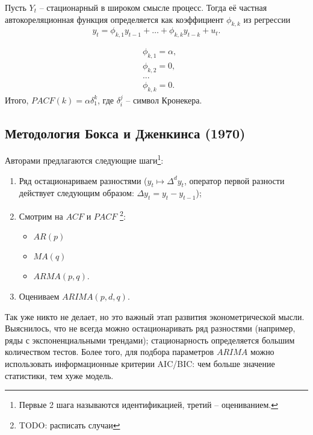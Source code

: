         \begin{definition}
            Пусть $Y_t$ -- стационарный в широком смысле процесс. Тогда её частная автокореляционная функция определяется как коэффициент $\phi_{k,k}$ из регрессии
            \begin{equation*}
                y_t = \phi_{k,1} y_{t-1} +\dots+ \phi_{k,k} y_{t-k} + u_t.
            \end{equation*}
        \end{definition}

        \begin{example}
            \begin{align*}
                & \phi_{k, 1} = \alpha, \\
                & \phi_{k, 2} = 0, \\
                & ... \\
                & \phi_{k, k} = 0.
            \end{align*}
            Итого, $PACF(k) = \alpha \delta_1^k$, где $\delta_i^j$ -- символ Кронекера.
        \end{example}

    \subsection{Методология Бокса и Дженкинса (1970)}
        Авторами предлагаются следующие шаги\footnote{Первые 2 шага называются идентификацией, третий -- оцениванием.}:
        \begin{enumerate}
            \item Ряд остационариваем разностями ($y_t \mapsto \Delta^d y_t$, оператор первой разности действует следующим образом: $\Delta y_t = y_t - y_{t-1}$);
            \item Смотрим на $ACF$ и $PACF$ \footnote{TODO: расписать случаи}:
                    \begin{itemize}
                        \item $AR(p)$
                        \item $MA(q)$
                        \item $ARMA(p,q)$.
                    \end{itemize}
            \item Оцениваем $ARIMA(p,d,q)$.
        \end{enumerate}

        Так уже никто не делает, но это важный этап развития эконометрической мысли. Выяснилось, что не всегда можно остационаривать ряд разностями (например, ряды с экспоненциальными трендами); стационарность определяется большим количеством тестов.
        Более того, для подбора параметров $ARIMA$ можно использовать информационные критерии AIC/BIC: чем больше значение статистики, тем хуже модель.

